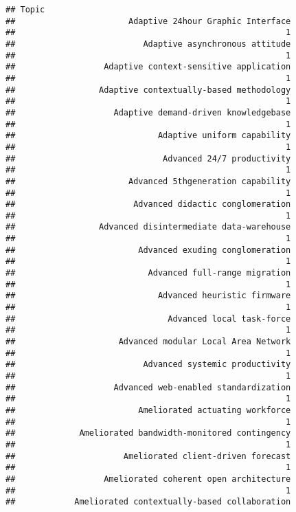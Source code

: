 \documentclass[
]{article}
\begin{document}
\begin{verbatim}
## Topic
##                       Adaptive 24hour Graphic Interface 
##                                                       1 
##                          Adaptive asynchronous attitude 
##                                                       1 
##                  Adaptive context-sensitive application 
##                                                       1 
##                 Adaptive contextually-based methodology 
##                                                       1 
##                    Adaptive demand-driven knowledgebase 
##                                                       1 
##                             Adaptive uniform capability 
##                                                       1 
##                              Advanced 24/7 productivity 
##                                                       1 
##                       Advanced 5thgeneration capability 
##                                                       1 
##                        Advanced didactic conglomeration 
##                                                       1 
##                 Advanced disintermediate data-warehouse 
##                                                       1 
##                         Advanced exuding conglomeration 
##                                                       1 
##                           Advanced full-range migration 
##                                                       1 
##                             Advanced heuristic firmware 
##                                                       1 
##                               Advanced local task-force 
##                                                       1 
##                     Advanced modular Local Area Network 
##                                                       1 
##                          Advanced systemic productivity 
##                                                       1 
##                    Advanced web-enabled standardization 
##                                                       1 
##                         Ameliorated actuating workforce 
##                                                       1 
##             Ameliorated bandwidth-monitored contingency 
##                                                       1 
##                      Ameliorated client-driven forecast 
##                                                       1 
##                  Ameliorated coherent open architecture 
##                                                       1 
##            Ameliorated contextually-based collaboration 

\end{verbatim}
\end{document}

